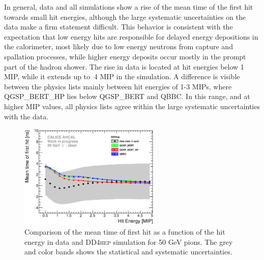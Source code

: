 \documentclass{JINST}
\newcommand\ddhep{\textsc{DD4hep}\xspace}
\begin{document}
In general, data and all simulations show a rise of the mean time of the first hit towards small hit energies, although the large systematic uncertainties on the data make a firm statement difficult. This behavior is consistent with the expectation that low energy hits are responsible for delayed energy depositions in the calorimeter, most likely due to low energy neutrons from capture and spallation processes, while higher energy deposits occur mostly in the prompt part of the hadron shower. The rise in data is located at hit energies below 1 MIP, while it extends up to $~4$ MIP in the simulation. A difference is visible between the physics lists mainly between hit energies of 1-3 MIPs, where QGSP\_BERT\_HP lies below QGSP\_BERT and QBBC. In this range, and at higher MIP values, all physics lists agree within the large systematic uncertainties with the data.

\begin{figure}[htbp!]
  \centering
  \includegraphics[width=0.6\textwidth]{fig/Time_Energy_50GeV_DD4hep.eps}
  \caption{Comparison of the mean time of first hit as a function of the hit energy in data and \ddhep simulation for 50 GeV pions. The grey and color bands shows the statistical and systematic uncertainties.}
  \label{fig:Energy_SimData_50GeV}
\end{figure}
\end{document}
